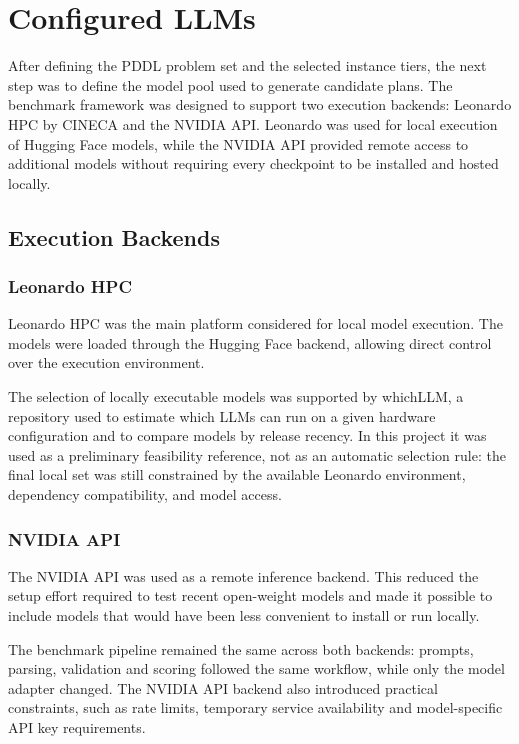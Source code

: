 \section{Configured LLMs}

After defining the PDDL problem set and the selected instance tiers, the next step was to define the model pool used to generate candidate plans. The benchmark framework was designed to support two execution backends: Leonardo HPC by CINECA and the NVIDIA API. Leonardo was used for local execution of Hugging Face models, while the NVIDIA API provided remote access to additional models without requiring every checkpoint to be installed and hosted locally.

\subsection{Execution Backends}

\subsubsection{Leonardo HPC}

Leonardo HPC was the main platform considered for local model execution. The models were loaded through the Hugging Face backend, allowing direct control over the execution environment.

The selection of locally executable models was supported by whichLLM, a repository used to estimate which LLMs can run on a given hardware configuration and to compare models by release recency. In this project it was used as a preliminary feasibility reference, not as an automatic selection rule: the final local set was still constrained by the available Leonardo environment, dependency compatibility, and model access.

\subsubsection{NVIDIA API}

The NVIDIA API was used as a remote inference backend. This reduced the setup effort required to test recent open-weight models and made it possible to include models that would have been less convenient to install or run locally.

The benchmark pipeline remained the same across both backends: prompts, parsing, validation and scoring followed the same workflow, while only the model adapter changed. The NVIDIA API backend also introduced practical constraints, such as rate limits, temporary service availability and model-specific API key requirements.

